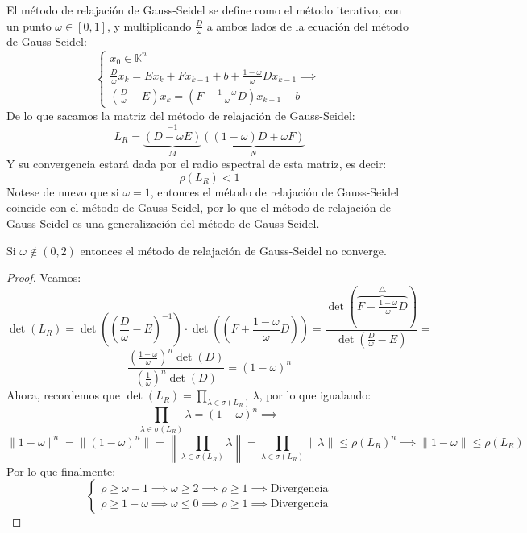 \begin{teorema}
    El método de relajación de Gauss-Seidel se define como el método iterativo, con un punto $\omega \in [0,1]$, y multiplicando $\frac{D}{\omega}$ a ambos lados de la ecuación del método de Gauss-Seidel:
    \[
    \begin{cases}
        x_0 \in \mathbb{K}^n \\
        \frac{D}{\omega} x_k = E x_k + F x_{k-1} + b + \frac{1-\omega}{\omega} D x_{k-1} \implies \\
        \left( \frac{D}{\omega} - E \right) x_k = \left( F + \frac{1-\omega}{\omega} D \right) x_{k-1} + b
    \end{cases}
    \]
    De lo que sacamos la matriz del método de relajación de Gauss-Seidel:
    \[
        L_R = \underbrace{(D - \omega E)}_{M}^{-1} \underbrace{((1-\omega) D + \omega F)}_{N} 
    \]
    Y su convergencia estará dada por el radio espectral de esta matriz, es decir:
    \[
        \rho(L_R) < 1
    \]
    Notese de nuevo que si $\omega = 1$, entonces el método de relajación de Gauss-Seidel coincide con el método de Gauss-Seidel, por lo que el método de relajación de Gauss-Seidel es una generalización del método de Gauss-Seidel.\\
\end{teorema}

\begin{teorema}
    Si $\omega \notin (0,2)$ entonces el método de relajación de Gauss-Seidel no converge.
\end{teorema}

\begin{proof}
    Veamos:
    \[
        \det(L_R) =
        \det( \left( \frac{D}{\omega} - E \right)^{-1} ) \cdot \det( \left( F + \frac{1-\omega}{\omega} D \right) ) =
        \frac{ \det( \overbrace{F + \frac{1-\omega}{\omega} D}^{\triangle}) }{ \det( \frac{D}{\omega} - E ) } =
    \]
    \[
        \frac{ \left( \frac{1-\omega}{\omega} \right)^n \det(D) }{ \left( \frac{1}{\omega} \right)^n \det(D) } =
        (1-\omega)^n
    \]
    Ahora, recordemos que $\det(L_R) = \prod_{\lambda \in \sigma(L_R)} \lambda$, por lo que igualando:
    \[
        \prod_{\lambda \in \sigma(L_R)} \lambda = (1-\omega)^n \implies
    \]
    \[
    \| 1 - \omega \|^n =
    \| (1 - \omega)^n \| =
    \left\| \prod_{\lambda \in \sigma(L_R)} \lambda \right\| =
    \prod_{\lambda \in \sigma(L_R)} \| \lambda \| \leq
    \rho(L_R)^n \implies
    \| 1 - \omega \| \leq \rho(L_R)
    \]
    Por lo que finalmente:
    \[
        \begin{cases}
            \rho \geq \omega -1 \implies \boxed{\omega \geq 2 \implies \rho \geq 1 \implies \text{Divergencia}} \\
            \rho \geq 1 - \omega \implies \boxed{\omega \leq 0 \implies \rho \geq 1 \implies \text{Divergencia}}
        \end{cases}
    \]
\end{proof}

